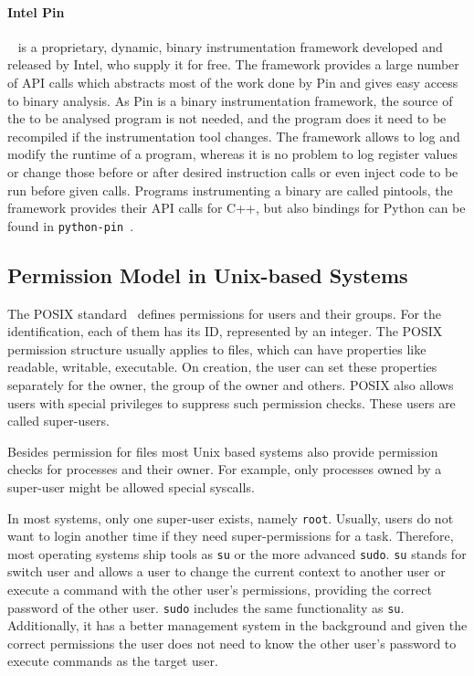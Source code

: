 \paragraph{Intel Pin}~\cite{pintool} is a proprietary, dynamic, binary
instrumentation framework developed and released by Intel, who supply it for
free. The framework provides a large number of API calls which abstracts most of
the work done by Pin and gives easy access to binary analysis. As Pin is a
binary instrumentation framework, the source of the to be analysed program is
not needed, and the program does it need to be recompiled if the instrumentation
tool changes. The framework allows to log and modify the runtime of a program,
whereas it is no problem to log register values or change those before or after
desired instruction calls or even inject code to be run before given calls.
Programs instrumenting a binary are called pintools, the framework provides
their API calls for C++, but also bindings for Python can be found in
\texttt{python-pin}~\cite{pythonpin}.

\subsection{Permission Model in Unix-based Systems}

The POSIX standard~\cite{posix} defines permissions for users and their groups.
For the identification, each of them has its ID, represented by an integer. The
POSIX permission structure usually applies to files, which can have properties
like readable, writable, executable. On creation, the user can set these
properties separately for the owner, the group of the owner and others. POSIX
also allows users with special privileges to suppress such permission checks.
These users are called super-users.

Besides permission for files most Unix based systems also provide permission
checks for processes and their owner. For example, only processes owned by a
super-user might be allowed special syscalls.

In most systems, only one super-user exists, namely \texttt{root}. Usually,
users do not want to login another time if they need super-permissions for a
task. Therefore, most operating systems ship tools as \texttt{su} or the more
advanced \texttt{sudo}. \texttt{su} stands for switch user and allows a user to
change the current context to another user or execute a command with the other
user's permissions, providing the correct password of the other user.
\texttt{sudo} includes the same functionality as \texttt{su}. Additionally, it
has a better management system in the background and given the correct
permissions the user does not need to know the other user's password to execute
commands as the target user.


